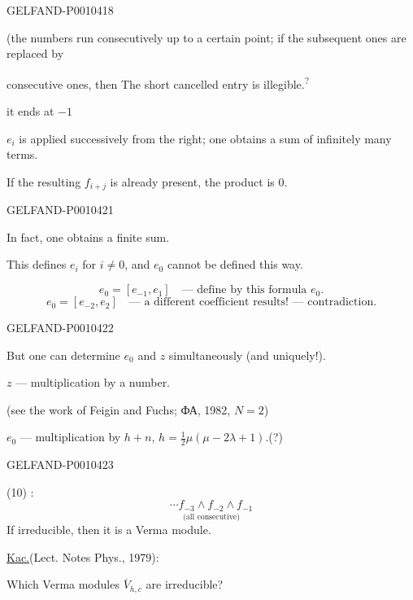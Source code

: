 \begin{GelfandAdjacentEvidence}{GELFAND-P001041}{8}


(the numbers run consecutively up to a certain point; if the subsequent ones are replaced by

consecutive ones, then The short cancelled entry is illegible.\textsuperscript{?}
\end{GelfandAdjacentEvidence}

it ends at $-1$

$e_i$ is applied successively from the right; one obtains a sum of infinitely many terms.

If the resulting $f_{i+j}$ is already present, the product is $0$.


\begin{GelfandAdjacentEvidence}{GELFAND-P001042}{1}

In fact, one obtains a finite sum.

This defines $e_i$ for $i\ne0$, and $e_0$ cannot be defined this way.

\[
e_0=[e_{-1},e_1]\quad\text{— define by this formula }e_0.
\]
\[
e_0=[e_{-2},e_2]\quad\text{— a different coefficient results! — contradiction.}
\]
\end{GelfandAdjacentEvidence}
\begin{GelfandAdjacentEvidence}{GELFAND-P001042}{2}


But one can determine $e_0$ and $z$ simultaneously (and uniquely!).

$z$ — multiplication by a number.

(see the work of Feigin and Fuchs; ФА, 1982, $N=2$)

$e_0$ — multiplication by $h+n$,\quad
$h=\tfrac12\mu(\mu-2\lambda+1)$.\quad (?)
\end{GelfandAdjacentEvidence}
\begin{GelfandAdjacentEvidence}{GELFAND-P001042}{3}


(10) :
\[
\underset{\text{(all consecutive)}}{\cdots f_{-3}\wedge f_{-2}\wedge f_{-1}}
\]
If irreducible, then it is a Verma module.

\underline{Kac.}\quad (Lect. Notes Phys., 1979):

Which Verma modules $\overline V_{h,c}$ are irreducible?
\end{GelfandAdjacentEvidence}
